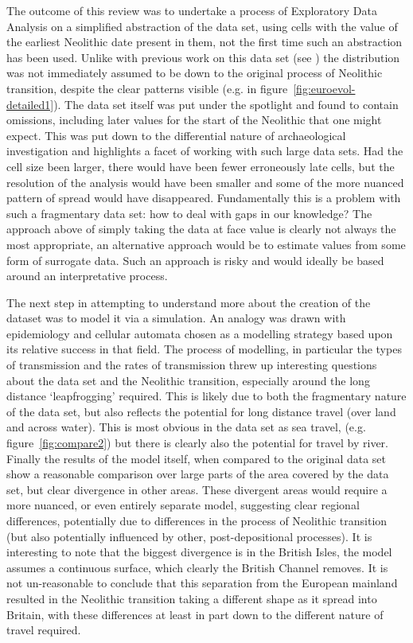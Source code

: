 The outcome of this review was to undertake a process of Exploratory Data Analysis on a simplified abstraction of the data set, using cells with the value of the earliest Neolithic date present in them, not the first time such an abstraction has been used. Unlike with previous work on this data set (see \citealp{gkiasta2003neolithic}) the distribution was not immediately assumed to be down to the original process of Neolithic transition, despite the clear patterns visible (e.g. in figure~\ref{fig:euroevol-detailed1}). The data set itself was put under the spotlight and found to contain omissions, including later values for the start of the Neolithic that one might expect. This was put down to the differential nature of archaeological investigation and highlights a facet of working with such large data sets. Had the cell size been larger, there would have been fewer erroneously late cells, but the resolution of the analysis would have been smaller and some of the more nuanced pattern of spread would have disappeared. Fundamentally this is a problem with such a fragmentary data set: how to deal with gaps in our knowledge? The approach above of simply taking the data at face value is clearly not always the most appropriate, an alternative approach would be to estimate values from some form of surrogate data. Such an approach is risky and would ideally be based around an interpretative process.

The next step in attempting to understand more about the creation of the dataset was to model it via a simulation. An analogy was drawn with epidemiology and cellular automata chosen as a modelling strategy based upon its relative success in that field. The process of modelling, in particular the types of transmission and the rates of transmission threw up interesting questions about the data set and the Neolithic transition, especially around the long distance `leapfrogging' required. This is likely due to both the fragmentary nature of the data set, but also reflects the potential for long distance travel (over land and across water). This is most obvious in the data set as sea travel, (e.g. figure~\ref{fig:compare2}) but there is clearly also the potential for travel by river. Finally the results of the model itself, when compared to the original data set show a reasonable comparison over large parts of the area covered by the data set, but clear divergence in other areas. These divergent areas would require a more nuanced, or even entirely separate model, suggesting clear regional differences, potentially due to differences in the process of Neolithic transition (but also potentially influenced by other, post-depositional processes). It is interesting to note that the biggest divergence is in the British Isles, the model assumes a continuous surface, which clearly the British Channel removes. It is not un-reasonable to conclude that this separation from the European mainland resulted in the Neolithic transition taking a different shape as it spread into Britain, with these differences at least in part down to the different nature of travel required.

